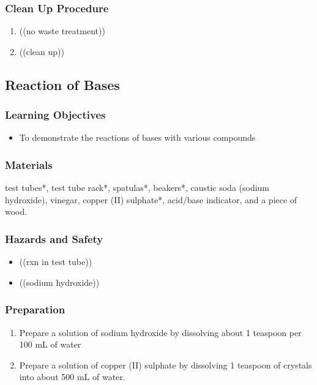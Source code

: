 \subsubsection*{Clean Up Procedure}
\begin{enumerate}
\item{((no waste treatment))}
\item{((clean up))}
\end{enumerate}

\subsection{Reaction of Bases}

\subsubsection*{Learning Objectives}
\begin{itemize}
\item{To demonstrate the reactions of bases with various compounds}
\end{itemize}

\subsubsection*{Materials}
test tubes*, test tube rack*, spatulas*, beakers*, caustic soda (sodium hydroxide), vinegar, copper (II) sulphate*, acid/base indicator, and a piece of wood.

\subsubsection*{Hazards and Safety}
\begin{itemize}
\item{((rxn in test tube))}
\item{((sodium hydroxide))}
\end{itemize}

\subsubsection*{Preparation}
\begin{enumerate}
\item{Prepare a solution of sodium hydroxide by dissolving about 1 teaspoon per 100 mL of water}
\item{Prepare a solution of copper (II) sulphate by dissolving 1 teaspoon of crystals into about 500 mL of water.}
\end{enumerate}


